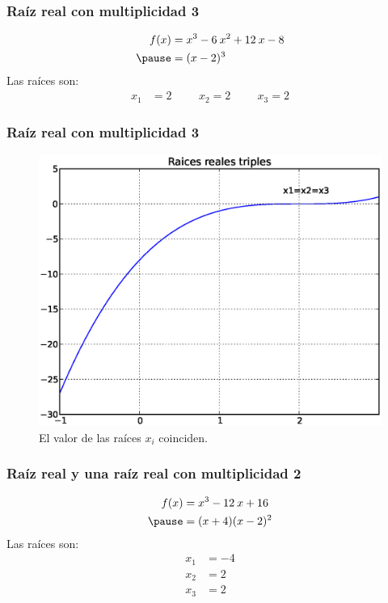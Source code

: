 \documentclass[12pt]{beamer}
\begin{document}
\begin{frame}[fragile]
\frametitle{Raíz real con multiplicidad 3}
\begin{eqnarray*}
\begin{aligned}
f (x) &=  x^{3} - 6 \: x^{2} + 12 \: x - 8 \\ \pause
&= (x - 2)^{3}
\end{aligned}
\end{eqnarray*}
\pause
Las raíces son:
\begin{align*}
x_{1} &= 2 \hspace{1cm}  x_{2} = 2 \hspace{1cm}  x_{3} = 2
\end{align*}
\end{frame}
\begin{frame}[fragile]
\frametitle{Raíz real con multiplicidad 3}
\begin{figure}
	\centering
	\includegraphics[scale=0.4]{Imagenes/raices02.eps}
	\caption{El valor de las raíces $x_{i}$ coinciden.} 
\end{figure}
\end{frame}
\begin{frame}[fragile]
\frametitle{Raíz real y una raíz real con multiplicidad 2}
\begin{eqnarray*}
\begin{aligned}
f (x) &= x^{3} - 12 \: x + 16 \\ \pause
&= (x + 4)(x - 2)^{2}
\end{aligned}
\end{eqnarray*}
Las raíces son:
\begin{align*}
x_{1} &= -4 \\
x_{2} &= 2 \\
x_{3} &= 2 \\
\end{align*}
\end{frame}
\end{document}
